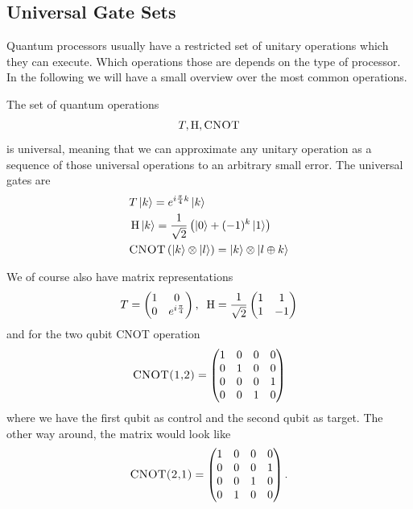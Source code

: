 \subsection{Universal Gate Sets}
Quantum processors usually have a restricted set of unitary operations which they can execute. Which operations those are depends on the type of processor. In the following we will have a small overview over the most common operations. 
\begin{def*}\phantom{...}

The set of quantum operations 
\begin{align*}
    T, \operatorname{H}, \textsc{CNOT}
\end{align*}
is universal, meaning that we can approximate any unitary operation as a sequence of those universal operations to an arbitrary small error.
The universal gates are
\begin{align}
    &T\ket{k}=e^{i\frac{\pi}{4}k}\ket{k}\\
    &\operatorname{H} \ket{k} = \frac{1}{\sqrt{2}}\left(\ket{0} + (-1)^k\ket{1}\right)\\
    &\textsc{CNOT}\left(\ket{k}\otimes\ket{l}\right) = \ket{k} \otimes \ket{l \oplus k}
\end{align}
\end{def*}
We of course also have matrix representations
\begin{align}
    T = \begin{pmatrix}
        1 & 0 \\ 0 & e^{i\frac{\pi}{4}}
    \end{pmatrix},\;\; \operatorname{H} = \frac{1}{\sqrt{2}} \begin{pmatrix}
        1 & 1 \\ 1 & -1
    \end{pmatrix}
\end{align}
and for the two qubit \textsc{CNOT} operation
\begin{align}
    \textsc{CNOT(1,2)} = \begin{pmatrix}
        1 & 0 & 0 & 0 \\
        0 & 1 & 0 & 0 \\
        0 & 0 & 0 & 1 \\
        0 & 0 & 1 & 0 \\
    \end{pmatrix}
\end{align}
where we have the first qubit as control and the second qubit as target. The other way around, the matrix would look like
\begin{align}
    \textsc{CNOT(2,1)} = \begin{pmatrix}
        1 & 0 & 0 & 0 \\
        0 & 0 & 0 & 1 \\
        0 & 0 & 1 & 0 \\
        0 & 1 & 0 & 0 \\
    \end{pmatrix}.
\end{align}
